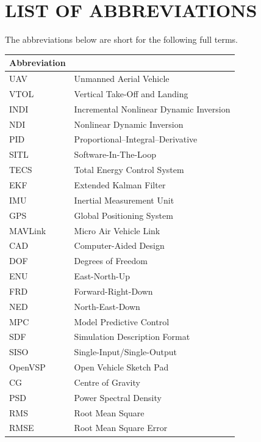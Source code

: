 \documentclass{article}
\begin{document}
\section*{LIST OF ABBREVIATIONS}
\noindent The abbreviations below are short for the following full terms.
\par\vspace{0.5\baselineskip}
\begin{longtable}{p{}p{}}
\textbf{Abbreviation}  \\
\midrule
UAV & Unmanned Aerial Vehicle \\
\midrule
VTOL & Vertical Take-Off and Landing \\
\midrule
INDI & Incremental Nonlinear Dynamic Inversion \\
\midrule
NDI & Nonlinear Dynamic Inversion \\
\midrule
PID & Proportional--Integral--Derivative \\
\midrule
SITL & Software-In-The-Loop \\
\midrule
TECS & Total Energy Control System \\
\midrule
EKF & Extended Kalman Filter \\
\midrule
IMU & Inertial Measurement Unit \\
\midrule
GPS & Global Positioning System \\
\midrule
MAVLink & Micro Air Vehicle Link \\
\midrule
CAD & Computer-Aided Design \\
\midrule
DOF & Degrees of Freedom \\
\midrule
ENU & East-North-Up \\
\midrule
FRD & Forward-Right-Down \\
\midrule
NED & North-East-Down \\
\midrule
MPC & Model Predictive Control \\
\midrule
SDF & Simulation Description Format \\
\midrule
SISO & Single-Input/Single-Output \\
\midrule
OpenVSP & Open Vehicle Sketch Pad \\
\midrule
CG & Centre of Gravity \\
\midrule
PSD & Power Spectral Density \\
\midrule
RMS & Root Mean Square \\
\midrule
RMSE & Root Mean Square Error \\
\end{longtable}
\setcounter{table}{0}%
\newpage
\renewcommand{\listtablename}{LIST OF TABLES}
\listoftables
\renewcommand{\listfigurename}{LIST OF FIGURES}
\listoffigures
\newpage
{}
\end{document}
